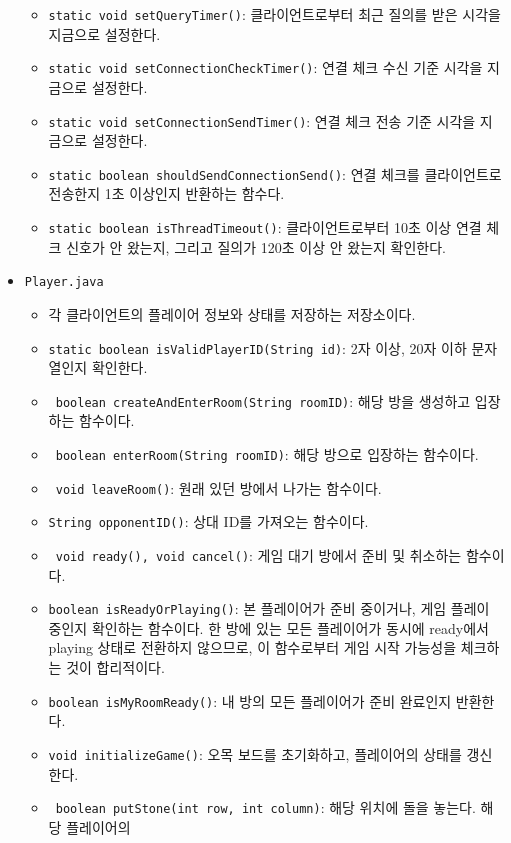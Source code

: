 \documentclass[a4paper, 10pt]{article}
\begin{document}
\begin{itemize}
\begin{itemize}
    \item \texttt{static void setQueryTimer()}: 클라이언트로부터 최근 질의를 받은 시각을 지금으로 설정한다.
    \item \texttt{static void setConnectionCheckTimer()}: 연결 체크 수신 기준 시각을 지금으로 설정한다.
    \item \texttt{static void setConnectionSendTimer()}: 연결 체크 전송 기준 시각을 지금으로 설정한다.
    \item \texttt{static boolean shouldSendConnectionSend()}: 연결 체크를 클라이언트로 전송한지 1초 이상인지 반환하는 함수다.
    \item \texttt{static boolean isThreadTimeout()}: 클라이언트로부터 10초 이상 연결 체크 신호가 안 왔는지, 그리고 질의가 120초 이상 안 왔는지 확인한다.
  \end{itemize}
  \item \texttt{Player.java}
  \begin{itemize}
    \item[] 각 클라이언트의 플레이어 정보와 상태를 저장하는 저장소이다.
    \item \texttt{static boolean isValidPlayerID(String id)}: 2자 이상, 20자 이하 문자열인지 확인한다.
    \item \texttt{\color{red} boolean createAndEnterRoom(String roomID)}: 해당 방을 생성하고 입장하는 함수이다.
    \item \texttt{\color{red} boolean enterRoom(String roomID)}: 해당 방으로 입장하는 함수이다.
    \item \texttt{\color{red} void leaveRoom()}: 원래 있던 방에서 나가는 함수이다.
    \item \texttt{String opponentID()}: 상대 ID를 가져오는 함수이다.
    \item \texttt{\color{red} void ready(), void cancel()}: 게임 대기 방에서 준비 및 취소하는 함수이다.
    \item \texttt{boolean isReadyOrPlaying()}: 본 플레이어가 준비 중이거나, 게임 플레이 중인지 확인하는 함수이다.
    한 방에 있는 모든 플레이어가 동시에 ready에서 playing 상태로 전환하지 않으므로, 이 함수로부터 게임 시작 가능성을
    체크하는 것이 합리적이다.
    \item \texttt{boolean isMyRoomReady()}: 내 방의 모든 플레이어가 준비 완료인지 반환한다.
    \item \texttt{void initializeGame()}: 오목 보드를 초기화하고, 플레이어의 상태를 갱신한다.
    \item \texttt{\color{red} boolean putStone(int row, int column)}: 해당 위치에 돌을 놓는다. 해당 플레이어의

\end{itemize}
\end{itemize}
\end{document}

